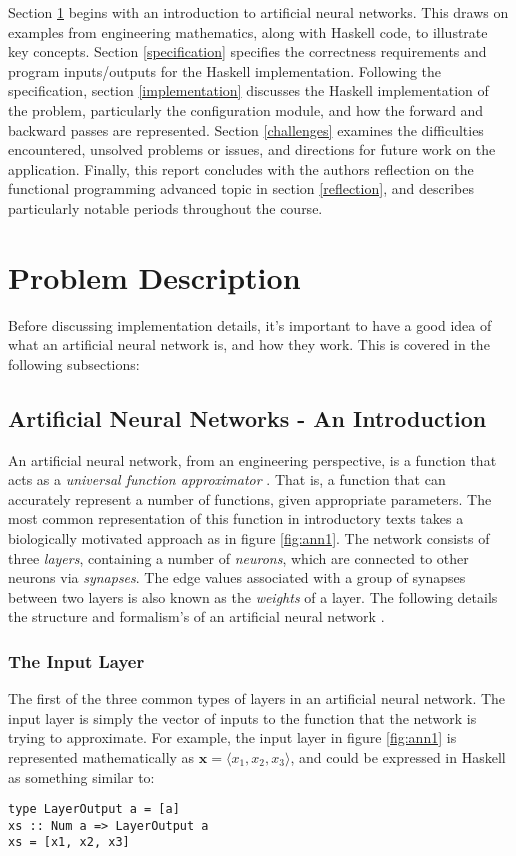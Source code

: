 \documentclass[a4paper]{article}
\begin{document}
Section \ref{problemDescription} begins with an introduction to 
artificial neural networks. This draws on examples from engineering 
mathematics, along with Haskell code, to illustrate key concepts. 
Section \ref{specification} specifies the correctness requirements and 
program inputs/outputs for the Haskell implementation. 
Following the specification, section \ref{implementation} discusses the Haskell
implementation of the problem, particularly the configuration module, and how
the forward and backward passes are represented. Section \ref{challenges}
examines the difficulties encountered, unsolved problems or issues, 
and directions for future work on the application. 
Finally, this report concludes with the authors
reflection on the functional programming advanced topic in section
\ref{reflection}, and describes particularly notable periods throughout the
course.

\section{Problem Description} \label{problemDescription}
Before discussing implementation details, it's important to have a good
idea of what an artificial neural network is, and how they work. This
is covered in the following subsections:

\subsection{Artificial Neural Networks - An Introduction}
An artificial neural network, from an engineering perspective, is a function
that acts as a \textit{universal function approximator}
\cite{hornik1989multilayer}. That is, a function
that can accurately represent a number of functions, given appropriate
parameters. The most common representation of this function in introductory
texts takes a biologically motivated approach as in figure \ref{fig:ann1}.
The network consists of three \textit{layers}, containing a number of
\textit{neurons}, which are connected to other neurons via \textit{synapses}.
The edge values associated with a group of synapses between two layers is also
known as the \textit{weights} of a layer. The following details
the structure and formalism's of an artificial neural network
\cite{russell2010artificial}.

\subsubsection{The Input Layer}
The first of the three common types of layers in an artificial neural network. 
The input layer is simply the vector of inputs to
the function that the network is trying to approximate. For example, the input
layer in figure \ref{fig:ann1} is represented mathematically as 
$\boldsymbol{x} = \langle x_1, x_2, x_3 \rangle$, and could be expressed in
Haskell as something similar to:
\begin{verbatim}
type LayerOutput a = [a]
xs :: Num a => LayerOutput a
xs = [x1, x2, x3]
\end{verbatim}
\end{document}
